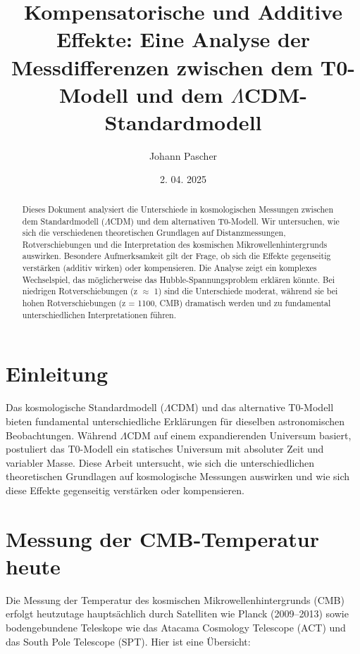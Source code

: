 \documentclass[a4paper,12pt]{article}
\theoremstyle{definition}
\theoremstyle{remark}
\begin{document}
	
	\title{Kompensatorische und Additive Effekte: Eine Analyse der Messdifferenzen zwischen dem T0-Modell und dem $\Lambda$CDM-Standardmodell}
	\author{Johann Pascher}
	\date{2. 04. 2025}
	\maketitle
	
	\begin{abstract}
		Dieses Dokument analysiert die Unterschiede in kosmologischen Messungen zwischen dem Standardmodell ($\Lambda$CDM) und dem alternativen T0-Modell. Wir untersuchen, wie sich die verschiedenen theoretischen Grundlagen auf Distanzmessungen, Rotverschiebungen und die Interpretation des kosmischen Mikrowellenhintergrunds auswirken. Besondere Aufmerksamkeit gilt der Frage, ob sich die Effekte gegenseitig verstärken (additiv wirken) oder kompensieren. Die Analyse zeigt ein komplexes Wechselspiel, das möglicherweise das Hubble-Spannungsproblem erklären könnte. Bei niedrigen Rotverschiebungen (z $\approx$ 1) sind die Unterschiede moderat, während sie bei hohen Rotverschiebungen (z = 1100, CMB) dramatisch werden und zu fundamental unterschiedlichen Interpretationen führen.
	\end{abstract}
	
	\tableofcontents
	\newpage
	
	\section{Einleitung}
	
	Das kosmologische Standardmodell ($\Lambda$CDM) und das alternative T0-Modell bieten fundamental unterschiedliche Erklärungen für dieselben astronomischen Beobachtungen. Während $\Lambda$CDM auf einem expandierenden Universum basiert, postuliert das T0-Modell ein statisches Universum mit absoluter Zeit und variabler Masse. Diese Arbeit untersucht, wie sich die unterschiedlichen theoretischen Grundlagen auf kosmologische Messungen auswirken und wie sich diese Effekte gegenseitig verstärken oder kompensieren.
		\section{Messung der CMB-Temperatur heute}

Die Messung der Temperatur des kosmischen Mikrowellenhintergrunds (CMB) erfolgt heutzutage hauptsächlich durch Satelliten wie Planck (2009–2013) sowie bodengebundene Teleskope wie das Atacama Cosmology Telescope (ACT) und das South Pole Telescope (SPT). Hier ist eine Übersicht:
\end{document}
